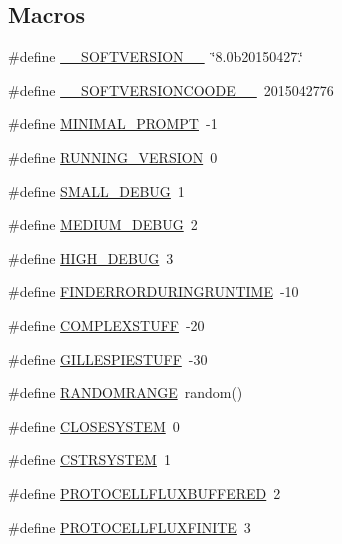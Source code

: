 \subsection*{Macros}
\begin{DoxyCompactItemize}
\item 
\#define \hyperlink{a00066_aab38659c2fe462437b89a1e85e619dc7}{\-\_\-\-\_\-\-S\-O\-F\-T\-V\-E\-R\-S\-I\-O\-N\-\_\-\-\_\-}~\char`\"{}8.\-0b20150427.\char`\"{}
\item 
\#define \hyperlink{a00066_ab95f82a54278bca76d1f3a974728825e}{\-\_\-\-\_\-\-S\-O\-F\-T\-V\-E\-R\-S\-I\-O\-N\-C\-O\-O\-D\-E\-\_\-\-\_\-}~2015042776
\item 
\#define \hyperlink{a00066_a972f6696f10f8159f336357f003493b6}{M\-I\-N\-I\-M\-A\-L\-\_\-\-P\-R\-O\-M\-P\-T}~-\/1
\item 
\#define \hyperlink{a00066_a72244054b9e2e45fe85cbef84bd42904}{R\-U\-N\-N\-I\-N\-G\-\_\-\-V\-E\-R\-S\-I\-O\-N}~0
\item 
\#define \hyperlink{a00066_a6f7711b8195edb3c3541c153ebcb4bfa}{S\-M\-A\-L\-L\-\_\-\-D\-E\-B\-U\-G}~1
\item 
\#define \hyperlink{a00066_ab0ead5a0a8c59ad5f4d9fcf0be28a5d7}{M\-E\-D\-I\-U\-M\-\_\-\-D\-E\-B\-U\-G}~2
\item 
\#define \hyperlink{a00066_ac2a71f467524d5299cbff5df96be638a}{H\-I\-G\-H\-\_\-\-D\-E\-B\-U\-G}~3
\item 
\#define \hyperlink{a00066_a0934dca9b46dc1ce8ccae606a6511f63}{F\-I\-N\-D\-E\-R\-R\-O\-R\-D\-U\-R\-I\-N\-G\-R\-U\-N\-T\-I\-M\-E}~-\/10
\item 
\#define \hyperlink{a00066_a186bfb39322832c790ce5403bc04330d}{C\-O\-M\-P\-L\-E\-X\-S\-T\-U\-F\-F}~-\/20
\item 
\#define \hyperlink{a00066_a27f5d30679c0e8877ba9246eb1a48ff4}{G\-I\-L\-L\-E\-S\-P\-I\-E\-S\-T\-U\-F\-F}~-\/30
\item 
\#define \hyperlink{a00066_a4cb4f6978b0d938a0523bd6946e7609d}{R\-A\-N\-D\-O\-M\-R\-A\-N\-G\-E}~random()
\item 
\#define \hyperlink{a00066_af1c170f636aa23e0e53a487ecf3994bd}{C\-L\-O\-S\-E\-S\-Y\-S\-T\-E\-M}~0
\item 
\#define \hyperlink{a00066_abbf4bce483f972294534d7148b928dc7}{C\-S\-T\-R\-S\-Y\-S\-T\-E\-M}~1
\item 
\#define \hyperlink{a00066_ab17e5a4ba4d937a561e57c9960a75115}{P\-R\-O\-T\-O\-C\-E\-L\-L\-F\-L\-U\-X\-B\-U\-F\-F\-E\-R\-E\-D}~2
\item 
\#define \hyperlink{a00066_a560cebce9c755a8ecb3887ad2d0b540e}{P\-R\-O\-T\-O\-C\-E\-L\-L\-F\-L\-U\-X\-F\-I\-N\-I\-T\-E}~3

\end{DoxyCompactItemize}
